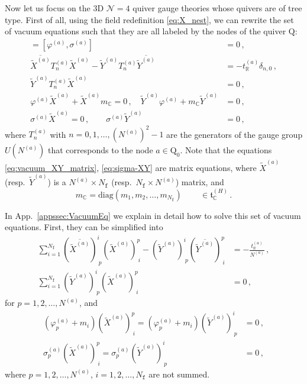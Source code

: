 \documentclass[12pt,a4paper]{article}
\renewcommand{\(}{\left(}
\renewcommand{\)}{\right)}
\renewcommand{\(}{\left(}
\renewcommand{\)}{\right)}
\begin{document}
Now let us focus on the 3D $\mathcal{N}=4$ quiver gauge theories whose quivers are of tree type. 
First of all, using the field redefinition \eqref{eq:X_nest}, we can rewrite the set of vacuum equations such that they are all labeled by the nodes of the quiver $\mathrm{Q}$:
\begin{align}
[\varphi^{(a)},\varphi^{(a)\dag}]=[\varphi^{(a)},\sigma^{(a)}]&=0\,,\label{eq:varphi-sigma}\\
\overline{\tilde{X}^{(a)}}T^{(a)}_n \tilde{X}^{(a)}-\tilde{Y}^{(a)} T^{(a)}_n \overline{\tilde{Y}^{(a)}}&=-t^{(a)}_{\mathbb{R}}\delta_{n,0}\,,\label{eq:vacuum1}\\
\tilde{Y}^{(a)} T^{(a)}_n \tilde{X}^{(a)}&=0\,,\label{eq:vacuum2}\\
\varphi^{(a)}\tilde{X}^{(a)}+\tilde{X}^{(a)}m_{\mathbb{C}}=0\,,\quad\tilde{Y}^{(a)}\varphi^{(a)}+m_{\mathbb{C}}\tilde{Y}^{(a)}&=0\,,\label{eq:vacuum_XY_matrix}\\
\sigma^{(a)}\tilde{X}^{(a)}=0\,,\quad\quad\sigma^{(a)}\tilde{Y}^{(a)}&=0\,,\label{eq:sigma-XY}
\end{align}
where $T^{(a)}_n$ with $n=0,1,\dots,(N^{(a)})^2-1$ are the generators of the gauge group $U(N^{(a)})$ that corresponds to the node $a\in \mathrm{Q}_0$.
Note that the equations \eqref{eq:vacuum_XY_matrix}, \eqref{eq:sigma-XY} are matrix equations, where $\tilde{X}^{(a)}$ (resp.\ $\tilde{Y}^{(a)}$) is a $N^{(a)}\times N_{\mathtt{f}}$ (resp.\ $N_{\mathtt{f}}\times N^{(a)}$) matrix, and
\begin{equation}
m_{\mathbb{C}}=\text{diag}(m_1,m_2,\dots,m_{N_\mathtt{f}})\quad\quad\,\in \mathfrak{t}_{\mathbb{C}}^{(H)}\,.
\end{equation}

\medskip
In App.~\ref{appssec:VacuumEq} we explain in detail how to solve this set of vacuum equations.
First, they can be simplified into
\begin{equation}
\begin{aligned}
\sum_{i=1}^{N_\mathtt{f}}(\overline{\tilde{X}^{(a)}})^i_{\ p} (\tilde{X}^{(a)})^p_{\ i}-(\tilde{Y}^{(a)})^i_{\ p} (\overline{\tilde{Y}^{(a)}})^p_{\ i}&=-\frac{t^{(a)}_\mathbb{R}}{N^{(a)}}\,,    \\
\sum_{i=1}^{N_\mathtt{f}}(\tilde{Y}^{(a)})^i_{\ p}  (\tilde{X}^{(a)})^p_{\ i}&=0\,, 
\end{aligned}    
\end{equation}
for $p=1,2,\dots,N^{(a)}$, and 
\begin{align}
(\varphi^{(a)}_p+m_i)(\tilde{X}^{(a)})^p_{\ i}=(\varphi^{(a)}_p+m_i)(\tilde{Y}^{(a)})^i_{\ p}&=0\,,
\\
\sigma^{(a)}_p(\tilde{X}^{(a)})^p_{\ i}=\sigma^{(a)}_p(\tilde{Y}^{(a)})^i_{\ p}&=0\,,
\end{align}
where $p=1,2,\dots,N^{(a)}$, $i=1,2,\dots,N_{\mathtt{f}}$ are not summed. 
\end{document}
